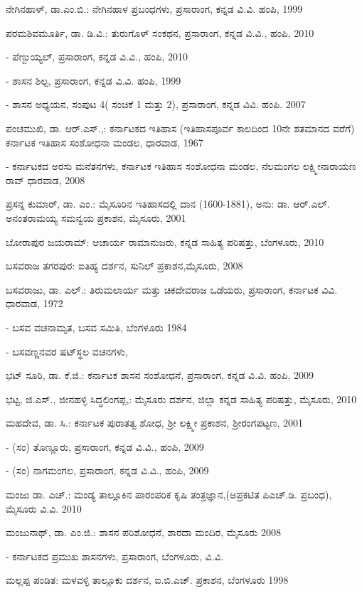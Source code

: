 \noindent
ನೇಗಿನಹಾಳ್​, ಡಾ.ಎಂ.ಬಿ.: ನೇಗಿನಹಾಳ ಪ್ರಬಂಧಗಳು, ಪ್ರಸಾರಾಂಗ, ಕನ್ನಡ ವಿ.ವಿ. ಹಂಪಿ, 1999

\noindent
ಪರಮಶಿವಮೂರ್ತಿ, ಡಾ. ಡಿ.ವಿ.: ತುರುಗೊಳ್​ ಸಂಕಥನ, ಪ್ರಸಾರಾಂಗ, ಕನ್ನಡ ವಿ.ವಿ., ಹಂಪಿ, 2010

- ಪೆಣ್ಬುಯ್ಯಲ್​, ಪ್ರಸಾರಾಂಗ, ಕನ್ನಡ ವಿ.ವಿ., ಹಂಪಿ, 2010

- ಶಾಸನ ಶಿಲ್ಪ, ಪ್ರಸಾರಾಂಗ, ಕನ್ನಡ ವಿ.ವಿ. ಹಂಪಿ, 1999

- ಶಾಸನ ಅಧ್ಯಯನ, ಸಂಪುಟ 4( ಸಂಚಿಕೆ 1 ಮತ್ತು 2), ಪ್ರಸಾರಾಂಗ, ಕನ್ನಡ ವಿವಿ. ಹಂಪಿ. 2007

\noindent
ಪಂಚಮುಖಿ, ಡಾ. ಆರ್​.ಎಸ್​.,: ಕರ್ನಾಟಕದ ಇತಿಹಾಸ (ಇತಿಹಾಸಪೂರ್ವ ಕಾಲದಿಂದ 10ನೇ ಶತಮಾನದ ವರೆಗೆ) ಕರ್ನಾಟಕ ಇತಿಹಾಸ ಸಂಶೋಧನಾ ಮಂಡಲ, ಧಾರವಾಡ, 1967

- ಕರ್ನಾಟಕದ ಅರಸು ಮನೆತನಗಳು, ಕರ್ನಾಟಕ ಇತಿಹಾಸ ಸಂಶೋಧನಾ ಮಂಡಲ, ನೆಲಮಂಗಲ ಲಕ್ಷ್ಮೀನಾರಾಯಣ ರಾವ್​ ಧಾರವಾಡ, 2008

\noindent
ಪ್ರಸನ್ನ ಕುಮಾರ್​, ಡಾ. ಎಂ.: ಮೈಸೂರಿನ ಇತಿಹಾಸದಲ್ಲಿ ದಾನ (1600-1881), ಅನು: ಡಾ. ಆರ್​.ಎಲ್​. ಅನಂತರಾಮಯ್ಯ ಸಮನ್ವಯ ಪ್ರಕಾಶನ, ಮೈಸೂರು, 2001

\noindent
ಬೋರಾಪುರ ಜಯರಾಮ್: ಆಚಾರ್ಯ ರಾಮಾನುಜರು, ಕನ್ನಡ ಸಾಹಿತ್ಯ ಪರಿಷತ್ತು, ಬೆಂಗಳೂರು, 2010

\noindent
ಬಸವರಾಜ ತಗರಪುರ: ಐತಿಹ್ಯ ದರ್ಶನ, ಸುನಿಲ್​ ಪ್ರಕಾಶನ,ಮೈಸೂರು, 2008

\noindent
ಬಸವರಾಜು, ಡಾ. ಎಲ್​.: ತಿರುಮಲಾರ್ಯ ಮತ್ತು ಚಿಕದೇವರಾಜ ಒಡೆಯರು, ಪ್ರಸಾರಾಂಗ, ಕರ್ನಾಟಕ ವಿವಿ. ಧಾರವಾಡ, 1972

- ಬಸವ ವಚನಾಮೃತ, ಬಸವ ಸಮಿತಿ, ಬೆಂಗಳೂರು 1984

- ಬಸವಣ್ಣನವರ ಷಟ್​ಸ್ಥಲ ವಚನಗಳು,

\noindent
ಭಟ್​ ಸೂರಿ, ಡಾ. ಕೆ.ಜಿ.: ಕರ್ನಾಟಕ ಶಾಸನ ಸಂಶೋಧನೆ, ಪ್ರಸಾರಾಂಗ, ಕನ್ನಡ ವಿ.ವಿ. ಹಂಪಿ, 2009

\noindent
ಭಟ್ಟ, ಜಿ.ಎಸ್​., ಜೀನಹಳ್ಳಿ ಸಿದ್ಧಲಿಂಗಪ್ಪ,: ಮೈಸೂರು ದರ್ಶನ, ಜಿಲ್ಲಾ ಕನ್ನಡ ಸಾಹಿತ್ಯ ಪರಿಷತ್ತು, ಮೈಸೂರು, 2010

\noindent
ಮಹದೇವ, ಡಾ. ಸಿ.: ಕರ್ನಾಟಕ ಪುರಾತತ್ವ ಶೋಧ, ಶ‍್ರೀ ಲಕ್ಷ್ಮೀ ಪ್ರಕಾಶನ, ಶ‍್ರೀರಂಗಪಟ್ಟಣ, 2001

- (ಸಂ) ತೊಣ್ಣೂರು, ಪ್ರಸಾರಾಂಗ, ಕನ್ನಡ ವಿ.ವಿ., ಹಂಪಿ, 2009

- (ಸಂ) ನಾಗಮಂಗಲ, ಪ್ರಸಾರಾಂಗ, ಕನ್ನಡ ವಿ.ವಿ., ಹಂಪಿ, 2009

\noindent
ಮಂಜು ಡಾ. ಎಚ್​.: ಮಂಡ್ಯ ತಾಲ್ಲೂಕಿನ ಪಾರಂಪರಿಕ ಕೃಷಿ ತಂತ್ರಜ್ಞಾನ,(ಅಪ್ರಕಟಿತ ಪಿಎಚ್​.ಡಿ. ಪ್ರಬಂಧ), ಮೈಸೂರು ವಿ.ವಿ. 2010

\noindent
ಮಂಜುನಾಥ್​, ಡಾ. ಎಂ.ಜಿ.: ಶಾಸನ ಪರಿಶೋಧನೆ, ಶಾರದಾ ಮಂದಿರ, ಮೈಸೂರು 2008

- ಕರ್ನಾಟಕದ ಪ್ರಮುಖ ಶಾಸನಗಳು, ಪ್ರಸಾರಾಂಗ, ಬೆಂಗಳೂರು, ವಿ.ವಿ.

\noindent
ಮಲ್ಲಪ್ಪ ಪಂಡಿತ: ಮಳವಳ್ಳಿ ತಾಲ್ಲೂಕು ದರ್ಶನ, ಐ.ಬಿ.ಎಚ್​. ಪ್ರಕಾಶನ, ಬೆಂಗಳೂರು 1998

